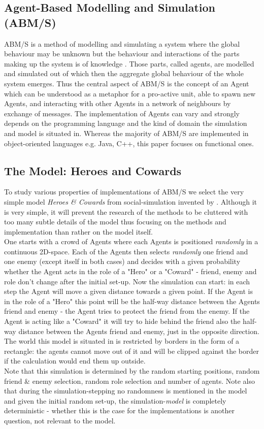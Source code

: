 \subsection{Agent-Based Modelling and Simulation (ABM/S)}
ABM/S is a method of modelling and simulating a system where the global behaviour may be unknown but the behaviour and interactions of the parts making up the system is of knowledge \cite{wooldridge_introduction_2009}. Those parts, called agents, are modelled and simulated out of which then the aggregate global behaviour of the whole system emerges. Thus the central aspect of ABM/S is the concept of an Agent which can be understood as a metaphor for a pro-active unit, able to spawn new Agents, and interacting with other Agents in a network of neighbours by exchange of messages. The implementation of Agents can vary and strongly depends on the programming language and the kind of domain the simulation and model is situated in. Whereas the majority of ABM/S are implemented in object-oriented languages e.g. Java, C++, this paper focuses on functional ones.

\subsection{The Model: Heroes and Cowards}
To study various properties of implementations of ABM/S we select the very simple model \textit{Heroes \& Cowards} from social-simulation invented by \cite{wilensky_introduction_2015}. Although it is very simple, it will prevent the research of the methods to be cluttered with too many subtle details of the model thus focusing on the methods and implementation than rather on the model itself. \\
One starts with a crowd of Agents where each Agents is positioned \textit{randomly} in a continuous 2D-space. Each of the Agents then selects \textit{randomly} one friend and one enemy (except itself in both cases) and decides with a given probability whether the Agent acts in the role of a "Hero" or a "Coward" - friend, enemy and role don't change after the initial set-up. Now the simulation can start: in each step the Agent will move a given distance towards a given point. If the Agent is in the role of a "Hero" this point will be the half-way distance between the Agents friend and enemy - the Agent tries to protect the friend from the enemy. If the Agent is acting like a "Coward" it will try to hide behind the friend also the half-way distance between the Agents friend and enemy, just in the opposite direction. \\
The world this model is situated in is restricted by borders in the form of a rectangle: the agents cannot move out of it and will be clipped against the border if the calculation would end them up outside. \\
Note that this simulation is determined by the random starting positions, random friend \& enemy selection, random role selection and number of agents. Note also that during the simulation-stepping no randomness is mentioned in the model and given the initial random set-up, the simulation-\textit{model} is completely deterministic - whether this is the case for the implementations is another question, not relevant to the model. 

